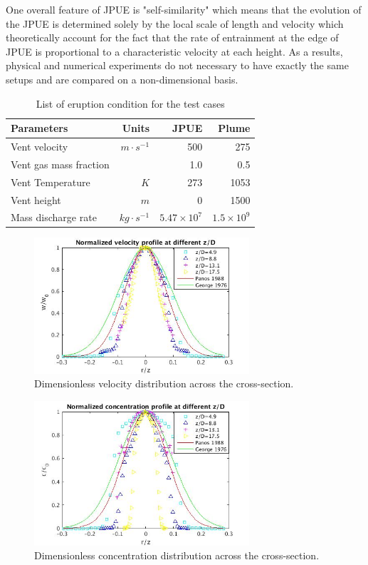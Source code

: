 \documentclass[journal abbreviation, manuscript]{copernicus}
\begin{document}
One overall feature of JPUE is "self-similarity" which means that the evolution of the JPUE is determined solely by the local scale of length and velocity which theoretically account for the fact that the rate of entrainment at the edge of JPUE is proportional to a characteristic velocity at each height. As a results, physical and numerical experiments do not necessary to have exactly the same setups and are compared on a non-dimensional basis.

\begin{table}[htp]
	\begin{centering}
      \caption{List of eruption condition for the test cases}		
	  \begin{tabular}{lrrr}
	    \hline
	    Parameters & Units  & JPUE & Plume \\
	    \hline
	    Vent velocity          & $m\cdot s^{-1}$  & 500               & 275 \\
	    Vent gas mass fraction &                  & 1.0               & 0.5 \\
	    Vent Temperature       & $K$              & 273               & 1053 \\
	    Vent height            & $m$              & 0                 & 1500 \\
	    Mass discharge rate    & $kg\cdot s^{-1}$ & $5.47 \times 10^7$ & $1.5 \times 10^9$\\
	    \hline
	  \end{tabular}
	  \label{tab:input_parameters}
	\end{centering}
\end{table}

\begin{figure}
\includegraphics[width=8cm]{vel_cross}
\caption{Dimensionless velocity distribution across the cross-section.}
\label{fig:JPUE_cross-section_vel}
\end{figure}
\begin{figure}
\includegraphics[width=8cm]{conc_cross}
\caption{Dimensionless concentration distribution across the cross-section.}
\label{fig:JPUE_cross-section_conc}
\end{figure}
\end{document}

